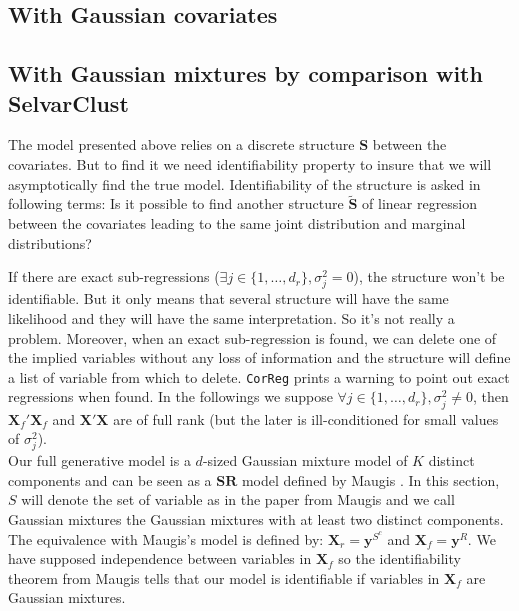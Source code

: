 \documentclass[12pt,a4paper]{report}
\begin{document}
		\subsection{With Gaussian covariates}
			
			\subsection{With Gaussian mixtures by comparison with SelvarClust} \label{preuveident}
	The model presented above relies on a discrete structure $\boldsymbol{S}$ between the covariates. But to find it we need identifiability property to insure that we will asymptotically find the true model. Identifiability of the structure is asked in following terms: Is it possible to find another structure $\tilde{\boldsymbol{S}}$ of linear regression between the covariates leading to the same joint distribution and marginal distributions? 
	
		If there are exact sub-regressions ($\exists j\in \{1,\dots,d_r\}, \sigma^2_j=0$), the structure won't be identifiable. But it only means that several structure will have the same likelihood and they will have the same interpretation. So it's not really a problem. Moreover, when an exact sub-regression is found, we can delete one of the implied variables without any loss of information and the structure will define a list of variable from which to delete. {\tt CorReg} prints a warning to point out exact regressions when found.
	In the followings we suppose $\forall j\in \{1,\dots,d_r\}, \sigma^2_j\neq 0$, then $\boldsymbol{X}_f'\boldsymbol{X}_f$ and $\boldsymbol{X}'\boldsymbol{X}$ are of full rank (but the later is ill-conditioned for small values of $\sigma^2_j$).
	\\
	
Our full generative model is a $d$-sized Gaussian mixture model of $K$ distinct components and 
%	
	can be seen as a $\mathbf{SR}$ model defined by Maugis \cite{maugis2009variable}. In this section, $S$ will denote the set of variable as in the paper from Maugis and we call Gaussian mixtures the Gaussian mixtures with at least two distinct components. The equivalence with Maugis's model is defined by:
	$\boldsymbol{X}_r=\boldsymbol{y}^{S^c}$ and $\boldsymbol{X}_f=\boldsymbol{y}^R$. We have supposed independence between variables in $\boldsymbol{X}_f$ so the identifiability theorem from Maugis tells that our model is identifiable if variables in $\boldsymbol{X}_f$ are Gaussian mixtures.%
	\\
	
\end{document}
